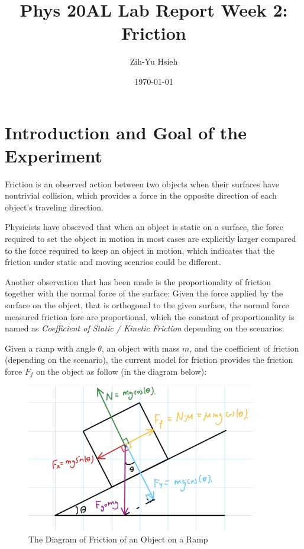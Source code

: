 \documentclass{article}
\title{Phys 20AL Lab Report Week 2: Friction}
\author{Zih-Yu Hsieh}
\date{\today}
\begin{document}
\maketitle

\tableofcontents

\pagebreak 

\section{Introduction and Goal of the Experiment}
Friction is an observed action between two objects when their surfaces have nontrivial collision, which provides a force in the opposite direction of each object's traveling direction.

Physicists have observed that when an object is static on a surface, the force required to set the object in motion in most cases are explicitly larger compared to the force required to keep an object in motion, which indicates that the friction under static and moving scenrios could be different.

Another observation that has been made is the proportionality of friction together with the normal force of the surface: Given the force applied by the surface on the object, that is orthogonal to the given surface, the normal force measured friction fore are proportional, which the constant of proportionality is named as \emph{Coefficient of Static / Kinetic Friction} depending on the scenarios.

\hfil

Given a ramp with angle $\theta$, an object with mass $m$, and the coefficient of friction (depending on the scenario), the current model for friction provides the friction force $F_f$ on the object as follow (in the diagram below):

\begin{figure}[h!]
    \centering
    \includegraphics[width=100mm]{friction_explain.jpg}
    \caption{The Diagram of Friction of an Object on a Ramp}
\end{figure}
\end{document}
